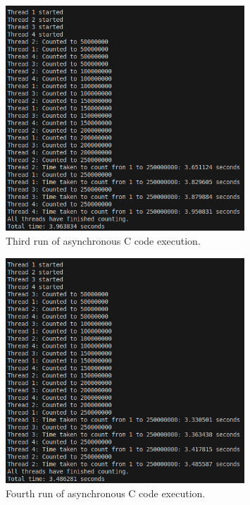 \documentclass[12pt,a4paper]{article}
\begin{document}
\begin{figure}[htbp]
    \centering
    \includegraphics[width=0.8\textwidth]{../async_records/results_c/result_3.png}
    \caption{Third run of asynchronous C code execution.}
    \label{fig:C-async-runtime-3}
\end{figure}

\begin{figure}[htbp]
    \centering
    \includegraphics[width=0.8\textwidth]{../async_records/results_c/result_4.png}
    \caption{Fourth run of asynchronous C code execution.}
    \label{fig:C-async-runtime-4}
\end{figure}
\end{document}
